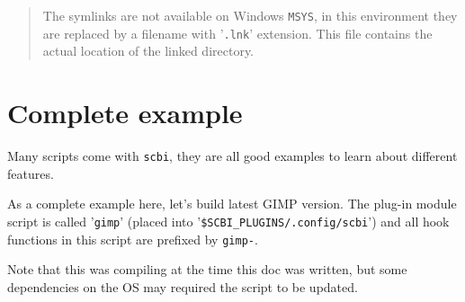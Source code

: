 \documentclass[a4paper,12pt,twoside]{article}
\newcommand{\code}[1]{\texttt{#1}}
\newcommand{\file}[1]{'{\texttt{#1}}'}
\let\stdsection\section
\renewcommand\section{\newpage\stdsection}
\begin{document}
\begin{quote}
	The symlinks are not available on Windows \code{MSYS}, in this environment they are replaced by a filename with \file{.lnk} extension. This file contains the actual location of the linked directory.
\end{quote}

\section{Complete example}

Many scripts come with \code{scbi}, they are all good examples to learn about different features.

As a complete example here, let's build latest GIMP version. The plug-in module script is called \file{gimp} (placed into \file{\$SCBI\_PLUGINS/.config/scbi}) and all hook functions in this script are prefixed by \code{gimp-}.

Note that this was compiling at the time this doc was written, but some dependencies on the OS may required the script to be updated.
\end{document}
